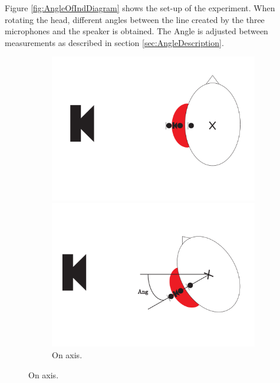 Figure \ref{fig:AngleOfIndDiagram} shows the set-up of the experiment. When rotating the head, different angles between the line created by the three microphones and the speaker is obtained. The Angle is adjusted between measurements as described in section \ref{sec:AngleDescription}. %
\begin{figure}[H]
	\centering
	\begin{subfigure}[b]{.4\textwidth}
		\includegraphics[width=\textwidth]{../Journal/Experiments/AngleOfIncidence/AngleOfIncidenceOnAxis.pdf}
		\caption{On axis.}
		\label{fig:AngOfIndOnax}
		\vspace{2ex}
		\includegraphics[width=\textwidth]{../Journal/Experiments/AngleOfIncidence/AngleOfIncidenceOffAxis.pdf}

\end{subfigure}
\end{figure}
